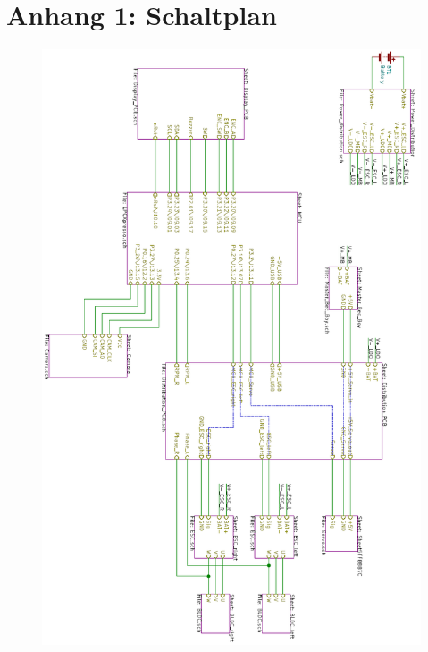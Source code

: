


\pagestyle{fancy}
\rhead{\thepage} \chead{} 
\cfoot{}


\section*{Anhang 1: Schaltplan} \label{SecAtt1}
\begin{figure}[H] %
\includegraphics[width=.87\textwidth]{attachement/Schaltplan1} 
\centering
\label{Att:Schaltplan1}
\end{figure}
